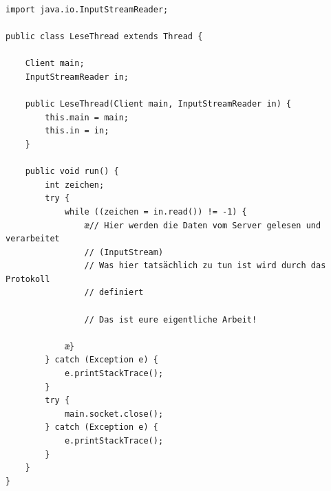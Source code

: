 \begin{lstlisting}
import java.io.InputStreamReader;

public class LeseThread extends Thread {

    Client main;
    InputStreamReader in;

    public LeseThread(Client main, InputStreamReader in) {
        this.main = main;
        this.in = in;
    }

    public void run() {
        int zeichen;
        try {
            while ((zeichen = in.read()) != -1) {
                æ// Hier werden die Daten vom Server gelesen und verarbeitet
                // (InputStream)
                // Was hier tatsächlich zu tun ist wird durch das Protokoll
                // definiert

                // Das ist eure eigentliche Arbeit!

            æ}
        } catch (Exception e) {
            e.printStackTrace();
        }
        try {
            main.socket.close();
        } catch (Exception e) {
            e.printStackTrace();
        }
    }
}
\end{lstlisting}